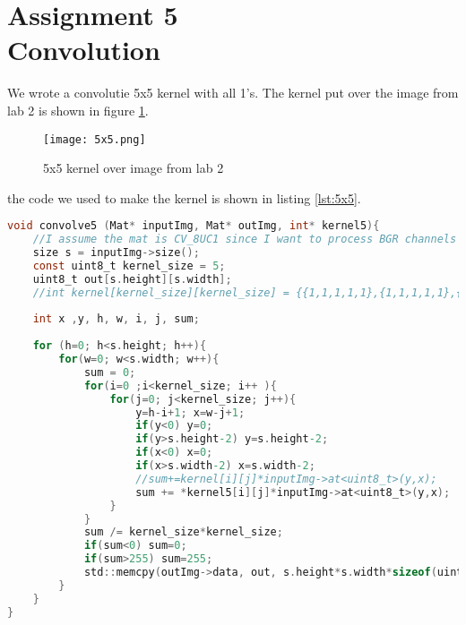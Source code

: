 \section {Assignment 5 \\ {Convolution}}
\label {sec:assignment_5}

We wrote a convolutie 5x5 kernel with all 1's. The kernel put over the image from lab 2 is shown in figure \ref{fig:5x5}.

\begin{figure}[h!]
    \centering
    \texttt{[image: 5x5.png]}
    \caption{5x5 kernel over image from lab 2}
    \label{fig:5x5}
\end{figure}

the code we used to make the kernel is shown in listing \ref{lst:5x5}.

\begin{lstlisting}[language=C, caption=5x5 kernel, label=lst:5x5]
void convolve5 (Mat* inputImg, Mat* outImg, int* kernel5){
    //I assume the mat is CV_8UC1 since I want to process BGR channels individually
    size s = inputImg->size();
    const uint8_t kernel_size = 5;
    uint8_t out[s.height][s.width];
    //int kernel[kernel_size][kernel_size] = {{1,1,1,1,1},{1,1,1,1,1},{1,1,1,1,1},{1,1,1,1,1},{1,1,1,1,1}};
    
    int x ,y, h, w, i, j, sum;
  
    for (h=0; h<s.height; h++){
        for(w=0; w<s.width; w++){
            sum = 0;
            for(i=0 ;i<kernel_size; i++ ){
                for(j=0; j<kernel_size; j++){
                    y=h-i+1; x=w-j+1;
                    if(y<0) y=0;
                    if(y>s.height-2) y=s.height-2;
                    if(x<0) x=0;
                    if(x>s.width-2) x=s.width-2;
                    //sum+=kernel[i][j]*inputImg->at<uint8_t>(y,x);
                    sum += *kernel5[i][j]*inputImg->at<uint8_t>(y,x);
                }
            }
            sum /= kernel_size*kernel_size;
            if(sum<0) sum=0;
            if(sum>255) sum=255;
            std::memcpy(outImg->data, out, s.height*s.width*sizeof(uint8_t));
        }
    }
}
\end{lstlisting}